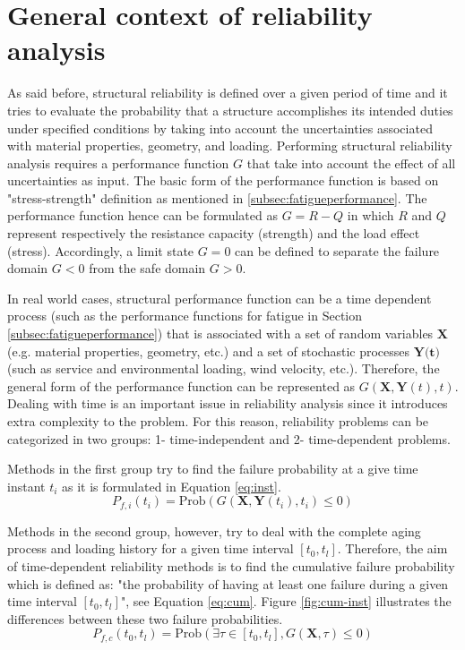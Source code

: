 \section{General context of reliability analysis}
\noindent
As said before, structural reliability is defined over a given period of time and it tries to evaluate the probability that a structure accomplishes its intended 
duties under specified conditions by taking into account the uncertainties associated with material properties, geometry, and loading. Performing structural reliability 
analysis requires a performance function $G$ that take into account the effect of all uncertainties as input. The basic form of the performance function is based on 
"stress-strength" definition as mentioned in \ref{subsec:fatigueperformance}. The performance function hence can be formulated as $G = R-Q$ in which $R$ and $Q$ represent
respectively the resistance capacity (strength) and the load effect (stress). Accordingly, a limit state $G=0$ can be defined to separate the failure domain $G<0$ from 
the safe domain $G>0$. 

In real world cases, structural performance function can be a time dependent process (such as the performance functions for fatigue in Section \ref{subsec:fatigueperformance})
that is associated with a set of random variables $\textbf{X}$ (e.g. material properties, geometry, etc.) and a set of stochastic processes $\textbf{Y(t)}$ (such as service and
environmental loading, wind velocity, etc.). Therefore, the general form of the performance function can be represented as $G(\textbf{X}, \textbf{Y}(t), t)$. Dealing with time 
is an important issue in reliability analysis since it introduces extra complexity to the problem. For this reason, reliability problems can be categorized in two groups:
1- time-independent and 2- time-dependent problems. 


Methods in the first group try to find the failure probability at a give time instant $t_i$ as it is formulated in Equation
\ref{eq:inst}. 
\begin{equation}
P_{f,i}(t_i) = \textrm{Prob}(G(\textbf{X},\textbf{Y}(t_i), t_i) \leq 0)
\label{eq:inst}
\end{equation}

Methods in the second group, however, try to deal with the complete aging process and loading history for a given time interval $[t_0, t_l]$. Therefore, the aim
of time-dependent reliability methods is to find the cumulative failure probability which is defined as: "the probability of having at least one failure during a given time 
interval $[t_0,t_l]$", see Equation \ref{eq:cum}. Figure \ref{fig:cum-inst} illustrates the differences between these two failure probabilities. 
\begin{equation}
P_{f,c}(t_0,t_l) = \textrm{Prob}(\exists\tau \in [t_0, t_l] , G(\textbf{X},\tau) \leq 0)
\label{eq:cum}
\end{equation}

